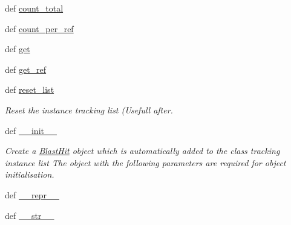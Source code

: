 \begin{DoxyCompactItemize}
\item 
def \hyperlink{namespaceHomologyMasker_ac68e288f6b788691b7124270834c5388}{count\-\_\-total}
\item 
def \hyperlink{namespaceHomologyMasker_ae0d9364665cc50703363a4f90eadb672}{count\-\_\-per\-\_\-ref}
\item 
def \hyperlink{namespaceHomologyMasker_a84b16a475c658df3d9c366a659024166}{get}
\item 
def \hyperlink{namespaceHomologyMasker_a04ee0b72f961634bc42abe3a3be8ed32}{get\-\_\-ref}
\item 
def \hyperlink{namespaceHomologyMasker_a3729ac42a69805ac68804c6a8cf56ac7}{reset\-\_\-list}
\begin{DoxyCompactList}\small\item\em Reset the instance tracking list (Usefull after. \end{DoxyCompactList}\item 
def \hyperlink{namespaceHomologyMasker_abdae33d75b01066dfa3cf9454254479e}{\-\_\-\-\_\-init\-\_\-\-\_\-}
\begin{DoxyCompactList}\small\item\em Create a \hyperlink{classHomologyMasker_1_1BlastHit}{Blast\-Hit} object which is automatically added to the class tracking instance list The object with the following parameters are required for object initialisation. \end{DoxyCompactList}\item 
def \hyperlink{namespaceHomologyMasker_a5de594f4ecece256383cb5c7c0c9fdd2}{\-\_\-\-\_\-repr\-\_\-\-\_\-}
\item 
def \hyperlink{namespaceHomologyMasker_a5a31649f3528f048c1f07c7b26edf091}{\-\_\-\-\_\-str\-\_\-\-\_\-}
\end{DoxyCompactItemize}
